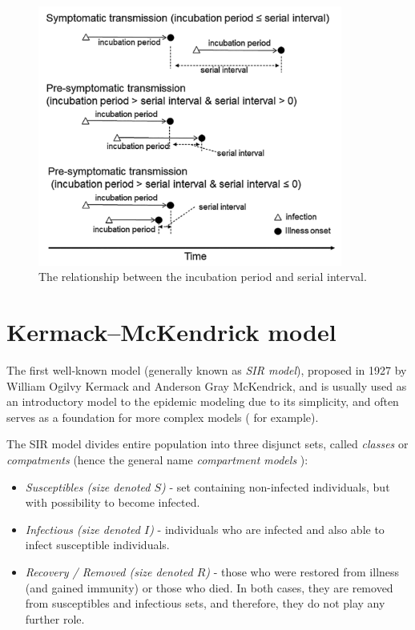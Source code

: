 \documentclass[
  digital, %
  oneside, %
  lof,     %
  lot,     %
]{fithesis4}
\begin{document}
\begin{figure}[h]
  \includegraphics[width=10cm]{static/images/nishiura2020_terms.png}
  \caption{The relationship between the incubation period and serial interval. \cite{nishiura2020}}
  \label{fig:nishiura-transmission}
\end{figure}


\section{Kermack–McKendrick model}

The first well-known model (generally 
known as \textit{SIR model}), proposed in 1927 by 
William Ogilvy Kermack and Anderson Gray McKendrick, and is 
usually used as an introductory model to the epidemic 
modeling \cite{martcheva2015} due to its simplicity, and
often serves as a foundation for more complex 
models (\cite{clancy2008} for example).

The SIR model divides entire population into three disjunct 
sets, called \textit{classes} or \textit{compatments} (hence the general 
name \textit{compartment models} \cite{bacaer2011}):

\begin{itemize}
  \item \textit{Susceptibles (size denoted $S$)} - set containing non-infected individuals, but with possibility to become infected.
  \item \textit{Infectious (size denoted $I$)} - individuals who are infected and also able to infect susceptible individuals.
  \item \textit{Recovery / Removed (size denoted $R$)} - those who were restored from illness (and gained immunity) or those who died. In both cases, they are removed from susceptibles and infectious sets, and therefore, they do not play any further role.
\end{itemize}
\end{document}
